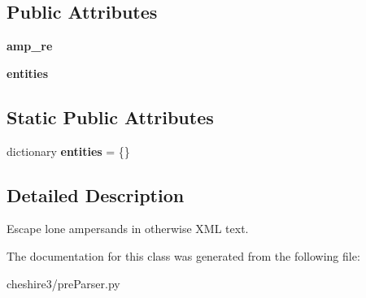 \subsection*{Public Attributes}
\begin{DoxyCompactItemize}
\item 
\hypertarget{classcheshire3_1_1pre_parser_1_1_amp_pre_parser_a3844e45f00edc12804efa34b5b5453da}{{\bfseries amp\-\_\-re}}\label{classcheshire3_1_1pre_parser_1_1_amp_pre_parser_a3844e45f00edc12804efa34b5b5453da}

\item 
\hypertarget{classcheshire3_1_1pre_parser_1_1_amp_pre_parser_a6291182da7a0ca90dc4616acdfdd25ed}{{\bfseries entities}}\label{classcheshire3_1_1pre_parser_1_1_amp_pre_parser_a6291182da7a0ca90dc4616acdfdd25ed}

\end{DoxyCompactItemize}
\subsection*{Static Public Attributes}
\begin{DoxyCompactItemize}
\item 
\hypertarget{classcheshire3_1_1pre_parser_1_1_amp_pre_parser_ab51ece1eda4203101ac1bc239c253cd3}{dictionary {\bfseries entities} = \{\}}\label{classcheshire3_1_1pre_parser_1_1_amp_pre_parser_ab51ece1eda4203101ac1bc239c253cd3}

\end{DoxyCompactItemize}


\subsection{Detailed Description}
\begin{DoxyVerb}Escape lone ampersands in otherwise XML text.\end{DoxyVerb}
 

The documentation for this class was generated from the following file\-:\begin{DoxyCompactItemize}
\item 
cheshire3/pre\-Parser.\-py\end{DoxyCompactItemize}
